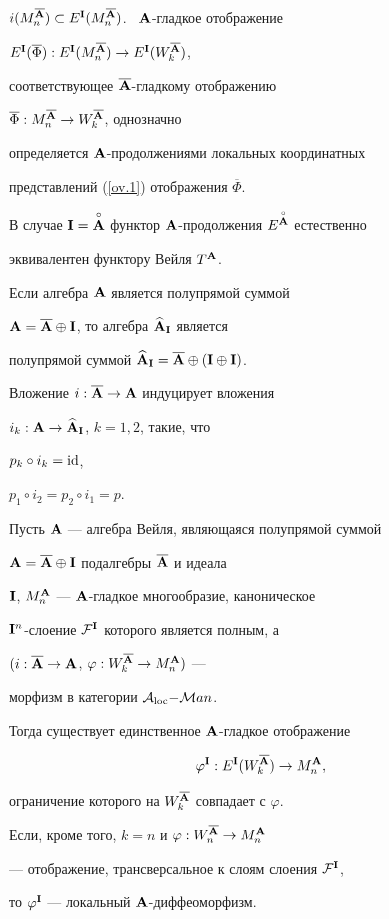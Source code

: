 $i(M_n^{\overline\A})\subset


E^\I(M^{\overline\A}_n)$. \ $\A$-гладкое отображение


$E^\I(\overline\Phi):E^\I(M_n^{\overline\A})\to


E^\I(W_k^{\overline\A})$,


соответствующее $\overline{{\bold A}}$-гладкому отображению


$\overline\Phi:M_n^{\overline{{\bold A}}}\to W_k^{\overline{{\bold A}}}$, однозначно


определяется ${\bold A}$-продолжениями локальных координатных


представлений (\ref{ov.1}) отображения $\overline\Phi$.


В случае ${\bold I}=\overset{\circ}{\bold A}{}$ функтор ${\bold A}$-продолжения $E^{\overset{\circ}{\bold A}{}}$ естественно


эквивалентен функтору Вейля $T^{\bold A}$.


 


Если алгебра ${\bold A}$ является полупрямой суммой


${\bold A}=\overline{{\bold A}}\oplus{\bold I}$, то алгебра $\widehat{{\bold A}}_{\bold I}$ является


полупрямой суммой $\widehat{{\bold A}}_{\bold I}=\overline{{\bold A}}\oplus({\bold I}\oplus{\bold I})$.


Вложение $i:\overline{{\bold A}}\to{\bold A}$ индуцирует вложения


$i_k:{\bold A}\to\widehat{{\bold A}}_{\bold I}$, $k=1,2$, такие, что


$p_k\circ i_k=\operatorname{id}$,


$p_1\circ i_2=p_2\circ i_1=p$.








\begin{thm}


Пусть ${\bold A}$ --- алгебра Вейля, являющаяся полупрямой суммой


${\bold A}=\overline{{\bold A}}\oplus{\bold I}$ подалгебры $\overline{{\bold A}}$ и идеала


${\bold I}$, $M^{\bold A}_n$ --- ${\bold A}$-гладкое многообразие, каноническое


${\bold I}^n$-слоение ${\cal F}^{{\bold I}}$ которого является полным, а


$(i:\overline{{\bold A}}\to{\bold A}$, $\varphi: W^{\overline{{\bold A}}}_k\to M^{\bold A}_n)$ ---


морфизм в категории ${\cal A}_{\operatorname{loc}}{-}{\cal M}an$.


Тогда существует единственное ${\bold A}$-гладкое отображение


$$


\varphi^\I:E^\I(W^{\overline\A}_k)\to M^\A_n,


$$


ограничение которого на $W^{\overline{{\bold A}}}_k$ совпадает с $\varphi$.


Если, кроме того, $k=n$ и $\varphi: W^{\overline{{\bold A}}}_n\to M^{\bold A}_n$


--- отображение, трансверсальное к слоям слоения ${\cal F}^{{\bold I}}$,


то $\varphi^{\bold I}$ --- локальный ${\bold A}$-диффеоморфизм.


\end{thm}





